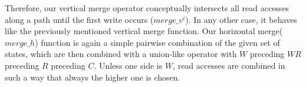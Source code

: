 Therefore, our vertical merge operator conceptually intersects all read accesses along a path until the first write 
occurs ($merge\_v^{i}$). In any other case, it behaves like the previously mentioned vertical merge function.
Our horizontal merge($merge\_h$) function is again a simple pairwise combination of the given set of states, which are then combined with a union-like operator with $W$ preceding $WR$ preceding $R$ preceding $C$. Unless one side is $W$, read accesses are combined in such a way that always the higher one is chosen.

%

